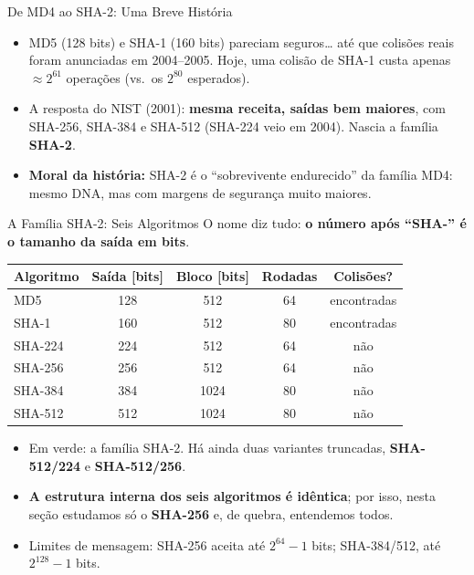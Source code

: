\documentclass{beamer}
\begin{document}
\begin{frame}{De MD4 ao SHA-2: Uma Breve História}
\begin{itemize}
        \item MD5 (128 bits) e SHA-1 (160 bits) pareciam seguros\dots{} até que \alert{colisões reais} foram anunciadas em 2004--2005. Hoje, uma colisão de SHA-1 custa apenas $\approx 2^{61}$ operações (vs.\ os $2^{80}$ esperados).
        \item A resposta do NIST (2001): \textbf{mesma receita, saídas bem maiores}, com SHA-256, SHA-384 e SHA-512 (SHA-224 veio em 2004). Nascia a família \textbf{SHA-2}.
        \item \textbf{Moral da história:} SHA-2 é o ``sobrevivente endurecido'' da família MD4: mesmo DNA, mas com margens de segurança muito maiores.
    \end{itemize}
\end{frame}

\begin{frame}{A Família SHA-2: Seis Algoritmos}
    O nome diz tudo: \textbf{o número após ``SHA-'' é o tamanho da saída em bits}.
    \begin{center}
        \small
        \begin{tabular}{lcccc}
            \toprule
            \textbf{Algoritmo} & \textbf{Saída [bits]} & \textbf{Bloco [bits]} & \textbf{Rodadas} & \textbf{Colisões?} \\
            \midrule
            \rowcolor{red!12}   MD5     & 128 & 512  & 64 & \alert{encontradas} \\
            \rowcolor{red!12}   SHA-1   & 160 & 512  & 80 & \alert{encontradas} \\
            \rowcolor{green!12} SHA-224 & 224 & 512  & 64 & não \\
            \rowcolor{green!12} SHA-256 & 256 & 512  & 64 & não \\
            \rowcolor{green!12} SHA-384 & 384 & 1024 & 80 & não \\
            \rowcolor{green!12} SHA-512 & 512 & 1024 & 80 & não \\
            \bottomrule
        \end{tabular}
    \end{center}
    \begin{itemize}
        \footnotesize
        \item Em \textcolor{green!50!black}{verde}: a família SHA-2. Há ainda duas variantes truncadas, \textbf{SHA-512/224} e \textbf{SHA-512/256}.
        \item \textbf{A estrutura interna dos seis algoritmos é idêntica}; por isso, nesta seção estudamos só o \textbf{SHA-256} e, de quebra, entendemos todos.
        \item Limites de mensagem: SHA-256 aceita até $2^{64}-1$ bits; SHA-384/512, até $2^{128}-1$ bits.
    \end{itemize}
\end{frame}
\end{document}
